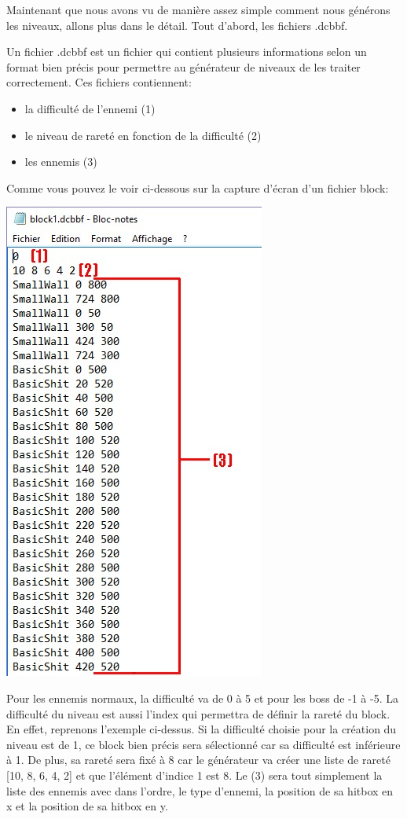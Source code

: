 \documentclass{article}
\begin{document}
Maintenant que nous avons vu de manière assez simple comment nous générons les niveaux, allons plus dans le détail. Tout d'abord, les fichiers .dcbbf.

Un fichier .dcbbf est un fichier qui contient plusieurs informations selon un format bien précis pour permettre au générateur de niveaux de les traiter correctement. Ces fichiers contiennent:

\begin{itemize}
	\item la difficulté de l'ennemi (1)
	\item le niveau de rareté en fonction de la difficulté (2)
	\item les ennemis (3)
\end{itemize}

Comme vous pouvez le voir ci-dessous sur la capture d'écran d'un fichier block:

\begin{center}
\includegraphics[scale=0.75]{fichiers_rapport/images/explaindcbbf.jpg}
\end{center}

Pour les ennemis normaux, la difficulté va de 0 à 5 et pour les boss de -1 à -5. La difficulté du niveau est aussi l'index qui permettra de définir la rareté du block. En effet, reprenons l'exemple ci-dessus. Si la difficulté choisie pour la création du niveau est de 1, ce block bien précis sera sélectionné car sa difficulté est inférieure à 1. De plus, sa rareté sera fixé à 8 car le générateur va créer une liste de rareté [10, 8, 6, 4, 2] et que l'élément d'indice 1 est 8. Le (3) sera tout simplement la liste des ennemis avec dans l'ordre, le type d'ennemi, la position de sa hitbox en x et la position de sa hitbox en y.
\end{document}
